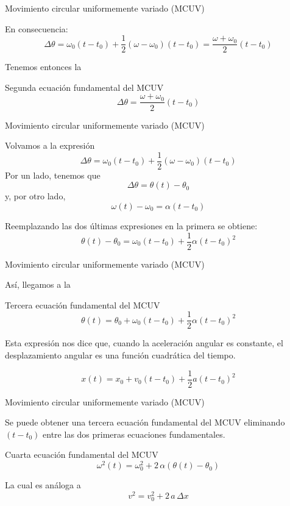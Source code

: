 \documentclass[11pt,handout,aspectratio=1610]{beamer}
\begin{document}
\begin{frame}{Movimiento circular uniformemente variado (MCUV)}

    En consecuencia: $$ \Delta \theta = \omega_0 \left(t - t_0\right) + \frac{1}{2} \left(\omega - \omega_0\right) \left(t - t_0\right) = \frac{\omega + \omega_0}{2} \left(t - t_0\right)$$

    \vspace{11pt}

    Tenemos entonces la 
    \begin{block}{Segunda ecuación fundamental del MCUV}
        $$ \Delta \theta = \frac{\omega + \omega_0}{2} \left(t - t_0\right)$$
    \end{block}
    
\end{frame}

\begin{frame}{Movimiento circular uniformemente variado (MCUV)}

Volvamos a la expresión $$ \Delta \theta = \omega_0 \left(t - t_0\right) + \frac{1}{2} \left(\omega - \omega_0\right) \left(t - t_0\right) $$ Por un lado, tenemos que $$\Delta \theta = \theta (t) - \theta_0$$ y, por otro lado, $$\omega (t) - \omega_0 = \alpha \left(t - t_0\right)$$

Reemplazando las dos últimas expresiones en la primera se obtiene: $$\theta (t) - \theta_0 = \omega_0 \left(t - t_0\right) + \frac{1}{2} \alpha \left(t-t_0\right)^2$$

\end{frame}

\begin{frame}{Movimiento circular uniformemente variado (MCUV)}

    Así, llegamos a la 
    \begin{block}{Tercera ecuación fundamental del MCUV}
        $$\theta (t) = \theta_0 + \omega_0 \left(t - t_0\right) + \frac{1}{2} \alpha \left(t-t_0\right)^2$$
    \end{block}

    Esta expresión nos dice que, cuando la aceleración angular es constante, el desplazamiento angular es una función cuadrática del tiempo.

    $$x(t) = x_0 + v_0 \left(t - t_0\right) + \frac{1}{2} a \left(t-t_0\right)^2$$

\end{frame}

\begin{frame}{Movimiento circular uniformemente variado (MCUV)}

Se puede obtener una tercera ecuación fundamental del MCUV eliminando $\left(t-t_0\right)$ entre las dos primeras ecuaciones fundamentales. 

\begin{block}{Cuarta ecuación fundamental del MCUV}
    $$\omega^2 (t) = \omega_0^2 + 2 \, \alpha \left(\theta (t) - \theta_0\right)$$
\end{block} La cual es análoga a $$v^2 = v_0^2 + 2 \, a \, \Delta x $$

\end{frame}
\end{document}
